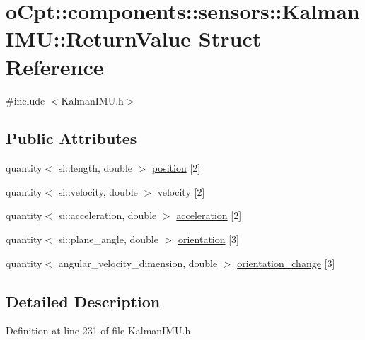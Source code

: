 \hypertarget{structo_cpt_1_1components_1_1sensors_1_1_kalman_i_m_u_1_1_return_value}{}\section{o\+Cpt\+:\+:components\+:\+:sensors\+:\+:Kalman\+I\+MU\+:\+:Return\+Value Struct Reference}
\label{structo_cpt_1_1components_1_1sensors_1_1_kalman_i_m_u_1_1_return_value}


{\ttfamily \#include $<$Kalman\+I\+M\+U.\+h$>$}

\subsection*{Public Attributes}
\begin{DoxyCompactItemize}
\item 
quantity$<$ si\+::length, double $>$ \hyperlink{structo_cpt_1_1components_1_1sensors_1_1_kalman_i_m_u_1_1_return_value_abe9309ecd8e15e858e7562d8ecaa97e8}{position} \mbox{[}2\mbox{]}
\item 
quantity$<$ si\+::velocity, double $>$ \hyperlink{structo_cpt_1_1components_1_1sensors_1_1_kalman_i_m_u_1_1_return_value_af8ecec3a5160190b61590af45f38aa3b}{velocity} \mbox{[}2\mbox{]}
\item 
quantity$<$ si\+::acceleration, double $>$ \hyperlink{structo_cpt_1_1components_1_1sensors_1_1_kalman_i_m_u_1_1_return_value_a58eafe9f06eaff954f605f673aa1cac4}{acceleration} \mbox{[}2\mbox{]}
\item 
quantity$<$ si\+::plane\+\_\+angle, double $>$ \hyperlink{structo_cpt_1_1components_1_1sensors_1_1_kalman_i_m_u_1_1_return_value_aec64bb098bb6ede5da247f1174bb8761}{orientation} \mbox{[}3\mbox{]}
\item 
quantity$<$ angular\+\_\+velocity\+\_\+dimension, double $>$ \hyperlink{structo_cpt_1_1components_1_1sensors_1_1_kalman_i_m_u_1_1_return_value_a30bf54b514973a267726760ebc81c935}{orientation\+\_\+change} \mbox{[}3\mbox{]}
\end{DoxyCompactItemize}


\subsection{Detailed Description}


Definition at line 231 of file Kalman\+I\+M\+U.\+h.



